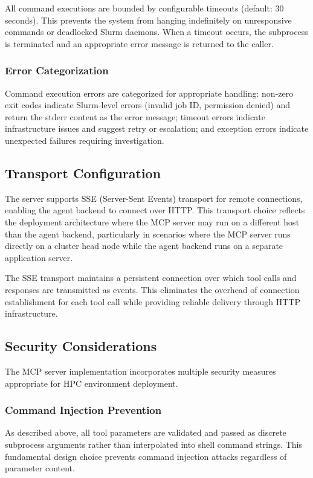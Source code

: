 All command executions are bounded by configurable timeouts (default: 30 seconds). This prevents the system from hanging indefinitely on unresponsive commands or deadlocked Slurm daemons. When a timeout occurs, the subprocess is terminated and an appropriate error message is returned to the caller.

\subsubsection{Error Categorization}

Command execution errors are categorized for appropriate handling: non-zero exit codes indicate Slurm-level errors (invalid job ID, permission denied) and return the stderr content as the error message; timeout errors indicate infrastructure issues and suggest retry or escalation; and exception errors indicate unexpected failures requiring investigation.

\subsection{Transport Configuration}

The server supports SSE (Server-Sent Events) transport for remote connections, enabling the agent backend to connect over HTTP. This transport choice reflects the deployment architecture where the MCP server may run on a different host than the agent backend, particularly in scenarios where the MCP server runs directly on a cluster head node while the agent backend runs on a separate application server.

The SSE transport maintains a persistent connection over which tool calls and responses are transmitted as events. This eliminates the overhead of connection establishment for each tool call while providing reliable delivery through HTTP infrastructure.

\subsection{Security Considerations}

The MCP server implementation incorporates multiple security measures appropriate for HPC environment deployment.

\subsubsection{Command Injection Prevention}

As described above, all tool parameters are validated and passed as discrete subprocess arguments rather than interpolated into shell command strings. This fundamental design choice prevents command injection attacks regardless of parameter content.

